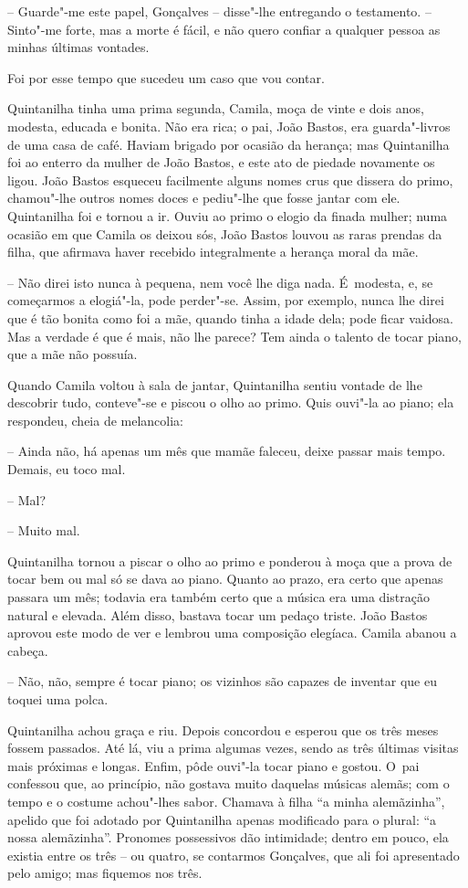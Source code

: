 -- Guarde"-me este papel, Gonçalves -- disse"-lhe entregando o testamento.
-- Sinto"-me forte, mas a morte é fácil, e não quero confiar a qualquer
pessoa as minhas últimas vontades.

Foi por esse tempo que sucedeu um caso que vou contar.

Quintanilha tinha uma prima segunda, Camila, moça de vinte e dois anos,
modesta, educada e bonita. Não era rica; o pai, João Bastos, era
guarda"-livros de uma casa de café. Haviam brigado por ocasião da
herança; mas Quintanilha foi ao enterro da mulher de João Bastos, e este
ato de piedade novamente os ligou. João Bastos esqueceu facilmente
alguns nomes crus que dissera do primo, chamou"-lhe outros nomes doces e
pediu"-lhe que fosse jantar com ele. Quintanilha foi e tornou a ir. Ouviu
ao primo o elogio da finada mulher; numa ocasião em que Camila os deixou
sós, João Bastos louvou as raras prendas da filha, que afirmava haver
recebido integralmente a herança moral da mãe.

-- Não direi isto nunca à pequena, nem você lhe diga nada. É~modesta, e,
se começarmos a elogiá"-la, pode perder"-se. Assim, por exemplo, nunca lhe
direi que é tão bonita como foi a mãe, quando tinha a idade dela; pode
ficar vaidosa. Mas a verdade é que é mais, não lhe parece? Tem ainda o
talento de tocar piano, que a mãe não possuía.

Quando Camila voltou à sala de jantar, Quintanilha sentiu vontade de lhe
descobrir tudo, conteve"-se e piscou o olho ao primo. Quis ouvi"-la ao
piano; ela respondeu, cheia de melancolia:

-- Ainda não, há apenas um mês que mamãe faleceu, deixe passar mais
tempo. Demais, eu toco mal.

-- Mal?

-- Muito mal.

Quintanilha tornou a piscar o olho ao primo e ponderou à moça que a
prova de tocar bem ou mal só se dava ao piano. Quanto ao prazo, era
certo que apenas passara um mês; todavia era também certo que a música
era uma distração natural e elevada. Além disso, bastava tocar um pedaço
triste. João Bastos aprovou este modo de ver e lembrou uma composição
elegíaca. Camila abanou a cabeça.

-- Não, não, sempre é tocar piano; os vizinhos são capazes de inventar
que eu toquei uma polca.

Quintanilha achou graça e riu. Depois concordou e esperou que os três
meses fossem passados. Até lá, viu a prima algumas vezes, sendo as três
últimas visitas mais próximas e longas. Enfim, pôde ouvi"-la tocar piano
e gostou. O~pai confessou que, ao princípio, não gostava muito daquelas
músicas alemãs; com o tempo e o costume achou"-lhes sabor. Chamava à
filha ``a minha alemãzinha'', apelido que foi adotado por Quintanilha
apenas modificado para o plural: ``a nossa alemãzinha''. Pronomes
possessivos dão intimidade; dentro em pouco, ela existia entre os três
-- ou quatro, se contarmos Gonçalves, que ali foi apresentado pelo
amigo; mas fiquemos nos três.

